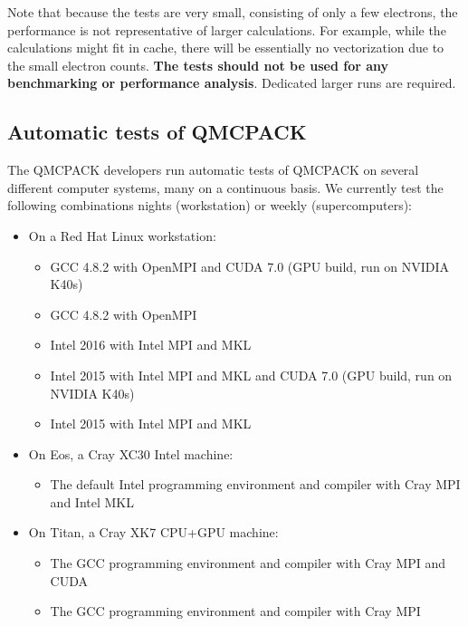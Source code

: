 Note that because the tests are very small, consisting of only a few
electrons, the performance is not representative of larger
calculations. For example, while the calculations might fit in cache,
there will be essentially no vectorization due to the small electron
counts. \textbf{The tests should not be used for any benchmarking or
performance analysis}. Dedicated larger runs are required.

\subsection{Automatic tests of QMCPACK}

The QMCPACK developers run automatic tests of QMCPACK on several
different computer systems,  many on a continuous basis. We currently test
the following combinations nights (workstation) or weekly (supercomputers):

\begin{itemize}
\item On a Red Hat Linux workstation:
  \begin{itemize}
  \item GCC 4.8.2 with OpenMPI and CUDA 7.0 (GPU build, run on NVIDIA K40s) 
  \item GCC 4.8.2 with OpenMPI 
  \item Intel 2016 with Intel MPI and MKL
  \item Intel 2015 with Intel MPI and MKL and CUDA 7.0 (GPU build, run on NVIDIA K40s) 
  \item Intel 2015 with Intel MPI  and MKL
  \end{itemize}
\item On Eos, a Cray XC30 Intel machine:
  \begin{itemize}
\item The default Intel programming environment and compiler with Cray MPI and Intel MKL
  \end{itemize}

\item On Titan, a Cray XK7 CPU+GPU machine:
  \begin{itemize}
  \item The GCC programming environment and compiler with Cray MPI and CUDA 
  \item The GCC programming environment and compiler with Cray MPI 
  \end{itemize}
\end{itemize}

